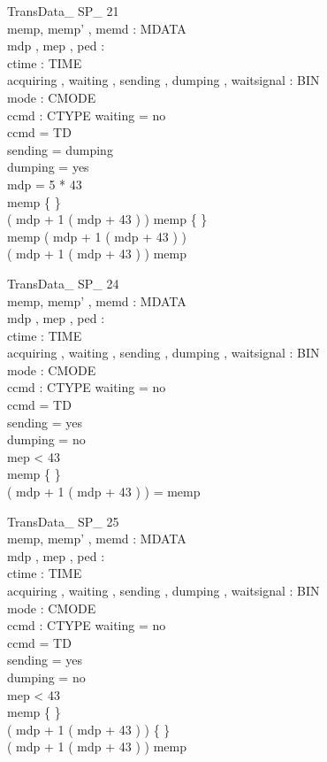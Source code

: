 \begin{schema}{TransData\_ SP\_ 21}\\
 memp, memp' , memd : \seq MDATA \\
 mdp , mep , ped : \nat \\
 ctime : TIME \\
 acquiring , waiting , sending , dumping , waitsignal : BIN \\
 mode : CMODE \\
 ccmd : CTYPE 
\where
 waiting = no \\
 ccmd = TD \\
 sending = dumping \\
 dumping = yes \\
 mdp = 5 * 43 \\
 memp \neq \{ \} \\
 ( mdp + 1 \upto ( mdp + 43 ) ) \cap \dom memp \neq \{ \} \\
 \lnot \dom memp \subseteq ( mdp + 1 \upto ( mdp + 43 ) ) \\
 \lnot ( mdp + 1 \upto ( mdp + 43 ) ) \subseteq \dom memp
\end{schema}

\begin{schema}{TransData\_ SP\_ 24}\\
 memp, memp' , memd : \seq MDATA \\
 mdp , mep , ped : \nat \\
 ctime : TIME \\
 acquiring , waiting , sending , dumping , waitsignal : BIN \\
 mode : CMODE \\
 ccmd : CTYPE 
\where
 waiting = no \\
 ccmd = TD \\
 sending = yes \\
 dumping = no \\
 mep < 43 \\
 memp \neq \{ \} \\
 ( mdp + 1 \upto ( mdp + 43 ) ) = \dom memp
\end{schema}


\begin{schema}{TransData\_ SP\_ 25}\\
 memp, memp' , memd : \seq MDATA \\
 mdp , mep , ped : \nat \\
 ctime : TIME \\
 acquiring , waiting , sending , dumping , waitsignal : BIN \\
 mode : CMODE \\
 ccmd : CTYPE 
\where
 waiting = no \\
 ccmd = TD \\
 sending = yes \\
 dumping = no \\
 mep < 43 \\
 memp \neq \{ \} \\
 ( mdp + 1 \upto ( mdp + 43 ) ) \neq \{ \} \\
 ( mdp + 1 \upto ( mdp + 43 ) ) \subset \dom memp
\end{schema}

